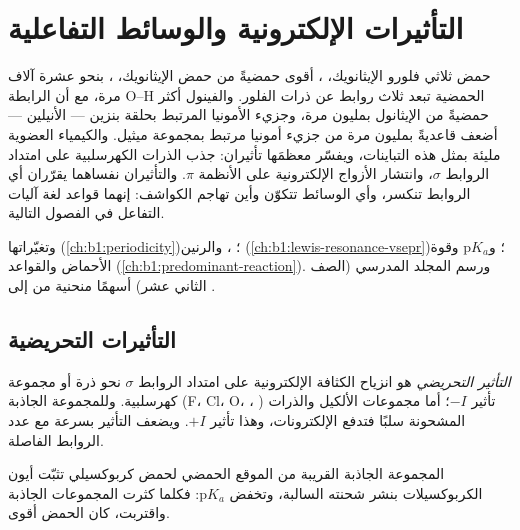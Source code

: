 \chapter{التأثيرات الإلكترونية والوسائط التفاعلية}\label{ch:b1:electronic-effects}

حمض ثلاثي فلورو الإيثانويك، ، أقوى حمضيةً من حمض الإيثانويك،
، بنحو عشرة آلاف مرة، مع أن الرابطة O--H الحمضية
تبعد ثلاث روابط عن ذرات الفلور. والفينول أكثر حمضيةً من الإيثانول بمليون
مرة، وجزيء الأمونيا المرتبط بحلقة بنزين ---
الأنيلين --- أضعف قاعديةً بمليون مرة من جزيء أمونيا
مرتبط بمجموعة ميثيل. والكيمياء العضوية مليئة بمثل هذه التباينات،
ويفسّر معظمَها تأثيران: جذب الذرات الكهرسلبية على امتداد
الروابط $\sigma$، وانتشار الأزواج الإلكترونية على الأنظمة $\pi$.
والتأثيران نفساهما يقرّران أي الروابط تنكسر، وأي
الوسائط تتكوّن وأين تهاجم الكواشف: إنهما قواعد لغة
آليات التفاعل في الفصول التالية.

\begin{recall}
 وتغيّراتها (\cref{ch:b1:periodicity})؛ ،  والرنين (\cref{ch:b1:lewis-resonance-vsepr})؛
و$\mathrm{p}K_a$ وقوة الأحماض والقواعد
(\cref{ch:b1:predominant-reaction}). ورسم المجلد المدرسي (الصف الثاني عشر)
أسهمًا منحنية من  إلى .
\end{recall}

\section{التأثيرات التحريضية}

\begin{definition}\label{def:b1:electronic-effects:inductive}
\emph{التأثير التحريضي} هو انزياح
الكثافة الإلكترونية على امتداد الروابط $\sigma$ نحو ذرة أو
مجموعة كهرسلبية. وللمجموعة الجاذبة (F، Cl، O، ، ) تأثير $-I$؛
أما مجموعات الألكيل والذرات المشحونة سلبًا فتدفع الإلكترونات، وهذا تأثير $+I$.
ويضعف التأثير بسرعة مع عدد الروابط الفاصلة.
\end{definition}

\begin{proposition}\label{prop:b1:electronic-effects:inductive-pka}
المجموعة الجاذبة القريبة من الموقع الحمضي لحمض كربوكسيلي
تثبّت أيون الكربوكسيلات بنشر شحنته السالبة،
وتخفض $\mathrm{p}K_a$: فكلما كثرت المجموعات الجاذبة واقتربت، كان
الحمض أقوى.
\end{proposition}

